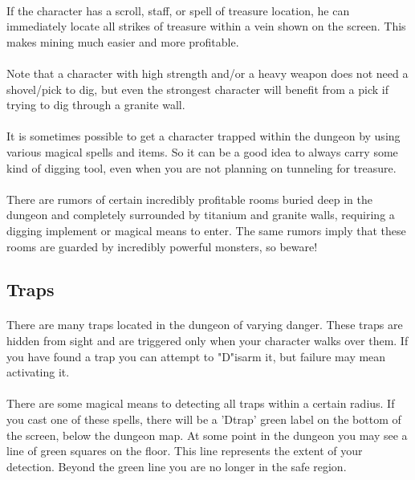 \paragraph{}If the character has a scroll, staff, or spell of treasure
location, he can immediately locate all strikes of treasure within a
vein shown on the screen. This makes mining much easier and more
profitable.

\paragraph{}Note that a character with high strength and/or a heavy
weapon does not need a shovel/pick to dig, but even the strongest
character will benefit from a pick if trying to dig through a granite
wall.

\paragraph{}It is sometimes possible to get a character trapped within
the dungeon by using various magical spells and items. So it can be a
good idea to always carry some kind of digging tool, even when you are
not planning on tunneling for treasure.

\paragraph{}There are rumors of certain incredibly profitable rooms
buried deep in the dungeon and completely surrounded by titanium and
granite walls, requiring a digging implement or magical means to enter.
The same rumors imply that these rooms are guarded by incredibly
powerful monsters, so beware!

\subsection{Traps}
\paragraph{}There are many traps located in the dungeon of varying
danger. These traps are hidden from sight and are triggered only when
your character walks over them. If you have found a trap you can attempt
to "D"isarm it, but failure may mean activating it.

\paragraph{}There are some magical means to detecting all traps within a
certain radius.  If you cast one of these spells, there will be a
'Dtrap' green label on the bottom of the screen, below the dungeon map.
At some point in the dungeon you may see a line of green squares on the
floor. This line represents the extent of your detection. Beyond the
green line you are no longer in the safe region.

